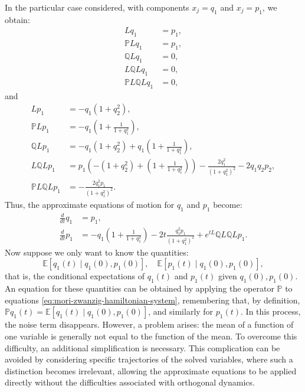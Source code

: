 \documentclass[12pt]{article}
\begin{document}
In the particular case considered, with components $x_j = q_1$ and $x_j = p_1$, we obtain:
\begin{align*}
Lq_1                        & = p_1, \\
\mathbb{P}Lq_1              & = p_1, \\
\mathbb{Q}Lq_1              & = 0,   \\
    
L\mathbb{Q}Lq_1             & = 0,   \\
    \mathbb{P}L \mathbb{Q}L q_1 & = 0,  
\end{align*}
and
\begin{align*}
    
Lp_1 &= -q_1(1 + q_2^2),\\
    \mathbb{P}Lp_1 &= -q_1\left(1 + \frac{1}{1 + q_1^2}\right),\\
    \mathbb{Q}Lp_1 &= -q_1(1 + q_2^2) + q_1\left(1 + \frac{1}{1 + q_1^2}\right),\\
    L\mathbb{Q}Lp_1 &= p_1\left(- (1 + q_2^2) + \left(1 + \frac{1}{1 + q_1^2} \right) \right) - \frac{2q_1^2}{(1 + q_1^2)^2} - 2q_1 q_2 p_2, \\
    \mathbb{P}L\mathbb{Q}Lp_1 & = -\frac{2q_1^2 p_1}{(1 + q_1^2)^2}.
\end{align*}
Thus, the approximate equations of motion for $q_1$ and $p_1$ become:
\begin{align}
    \frac{d}{dt} q_1 & = p_1, \nonumber \\
\frac{d}{dt} p_1 & = -q_1\left(1 + \frac{1}{1 + q_1^2}\right) - 2t\frac
{q_1^2 p_1}{(1 + q_1^2)^2} + e^{tL} \mathbb{Q}L \mathbb{Q}L p_1. \label{eq:mori-zwanzig-hamiltonian-system}
\end{align}
Now suppose we only want to know the quantities:
\begin{equation*}
    \mathbb{E}[q_1(t) \mid q_1(0), p_1(0)], \quad \mathbb{E}[p_1(t) \mid q_1(0), p_1(0)],
\end{equation*}
that is, the conditional expectations of $q_1(t)$ and $p_1(t)$ given $q_1(0), p_1(0)$.
An equation for these quantities can be obtained by applying the operator $\mathbb{P}$ to equations \eqref{eq:mori-zwanzig-hamiltonian-system}, remembering that, by definition, $\mathbb{P}q_1(t) = \mathbb{E}[q_1(t) \mid q_1(0), p_1(0)]$, and similarly for $p_1(t)$. In this process, the noise term disappears.
 However, a problem arises: the mean of a function of one variable is generally not equal to the function of the mean. To overcome this difficulty, an additional simplification is necessary. This complication can be avoided by considering specific trajectories of the solved variables, where such a distinction becomes irrelevant, allowing the approximate equations to be applied directly without the difficulties associated with orthogonal dynamics.
\end{document}

